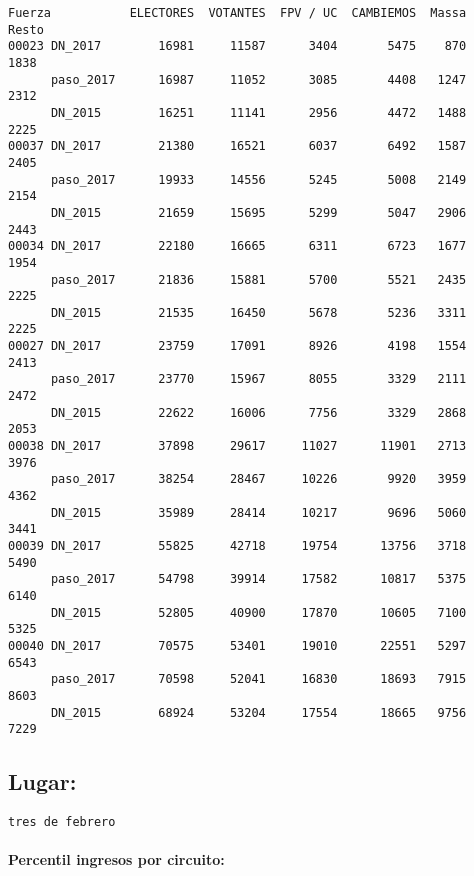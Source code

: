\documentclass[11pt]{article}
\begin{document}
    \begin{verbatim}
Fuerza           ELECTORES  VOTANTES  FPV / UC  CAMBIEMOS  Massa  Resto
00023 DN_2017        16981     11587      3404       5475    870   1838
      paso_2017      16987     11052      3085       4408   1247   2312
      DN_2015        16251     11141      2956       4472   1488   2225
00037 DN_2017        21380     16521      6037       6492   1587   2405
      paso_2017      19933     14556      5245       5008   2149   2154
      DN_2015        21659     15695      5299       5047   2906   2443
00034 DN_2017        22180     16665      6311       6723   1677   1954
      paso_2017      21836     15881      5700       5521   2435   2225
      DN_2015        21535     16450      5678       5236   3311   2225
00027 DN_2017        23759     17091      8926       4198   1554   2413
      paso_2017      23770     15967      8055       3329   2111   2472
      DN_2015        22622     16006      7756       3329   2868   2053
00038 DN_2017        37898     29617     11027      11901   2713   3976
      paso_2017      38254     28467     10226       9920   3959   4362
      DN_2015        35989     28414     10217       9696   5060   3441
00039 DN_2017        55825     42718     19754      13756   3718   5490
      paso_2017      54798     39914     17582      10817   5375   6140
      DN_2015        52805     40900     17870      10605   7100   5325
00040 DN_2017        70575     53401     19010      22551   5297   6543
      paso_2017      70598     52041     16830      18693   7915   8603
      DN_2015        68924     53204     17554      18665   9756   7229
    \end{verbatim}

    
    \hypertarget{lugar}{%
\subsection{Lugar:}\label{lugar}}

    
    \begin{Verbatim}[commandchars=\\\{\}]
tres de febrero

    \end{Verbatim}

    \hypertarget{percentil-ingresos-por-circuito}{%
\paragraph{Percentil ingresos por
circuito:}\label{percentil-ingresos-por-circuito}}
\end{document}
